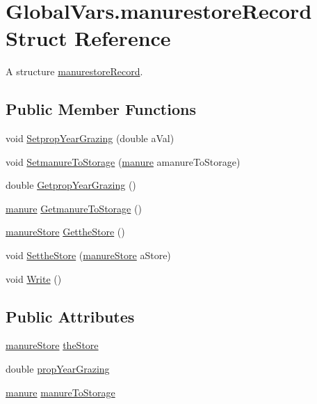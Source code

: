 \hypertarget{struct_global_vars_1_1manurestore_record}{}\section{Global\+Vars.\+manurestore\+Record Struct Reference}
\label{struct_global_vars_1_1manurestore_record}


A structure \mbox{\hyperlink{struct_global_vars_1_1manurestore_record}{manurestore\+Record}}.  


\subsection*{Public Member Functions}
\begin{DoxyCompactItemize}
\item 
void \mbox{\hyperlink{struct_global_vars_1_1manurestore_record_a159a0073b4ebf619056dd88a4e2aa7b8}{Setprop\+Year\+Grazing}} (double a\+Val)
\item 
void \mbox{\hyperlink{struct_global_vars_1_1manurestore_record_abc16bb40bedf65c707279636db4de2c1}{Setmanure\+To\+Storage}} (\mbox{\hyperlink{classmanure}{manure}} amanure\+To\+Storage)
\item 
double \mbox{\hyperlink{struct_global_vars_1_1manurestore_record_a94105a074cd1fce9bfd6ee546f399eea}{Getprop\+Year\+Grazing}} ()
\item 
\mbox{\hyperlink{classmanure}{manure}} \mbox{\hyperlink{struct_global_vars_1_1manurestore_record_a4b01a06869a3a1bda10569c2f15a65b3}{Getmanure\+To\+Storage}} ()
\item 
\mbox{\hyperlink{classmanure_store}{manure\+Store}} \mbox{\hyperlink{struct_global_vars_1_1manurestore_record_acc9b60e40c02a7a9062f6f4721b193da}{Getthe\+Store}} ()
\item 
void \mbox{\hyperlink{struct_global_vars_1_1manurestore_record_a74da5cde1b258bda8027cd39ece813fa}{Setthe\+Store}} (\mbox{\hyperlink{classmanure_store}{manure\+Store}} a\+Store)
\item 
void \mbox{\hyperlink{struct_global_vars_1_1manurestore_record_a2f25777efedfd194220f7703abf3f212}{Write}} ()
\end{DoxyCompactItemize}
\subsection*{Public Attributes}
\begin{DoxyCompactItemize}
\item 
\mbox{\hyperlink{classmanure_store}{manure\+Store}} \mbox{\hyperlink{struct_global_vars_1_1manurestore_record_a2f44c69503f740a600e7d7e952d5b392}{the\+Store}}
\item 
double \mbox{\hyperlink{struct_global_vars_1_1manurestore_record_aac39b4452d3d81cab1bf310fc4f19514}{prop\+Year\+Grazing}}
\item 
\mbox{\hyperlink{classmanure}{manure}} \mbox{\hyperlink{struct_global_vars_1_1manurestore_record_a07faab94782d0887ad2bb4329df47436}{manure\+To\+Storage}}
\end{DoxyCompactItemize}


